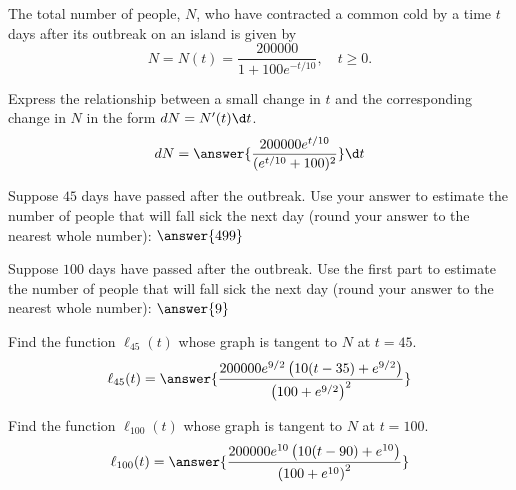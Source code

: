 \documentclass{ximera}
\begin{document}
The total number of people, $N$, who have contracted a common cold by a time $t$ days after its outbreak on an island is given by
\[
N=N(t)=\frac{200000}{1+100e^{-t/10}},\quad t\ge0.
\]
\begin{exercise}
Express the relationship between a small change in $t$ and the corresponding change in $N$ in the form $dN=N'(t)\d t$.
\[
dN=\answer{\frac{200000 e^{t/10}}{(e^{t/10}+100)^2}}\d t
\]
\begin{exercise}
Suppose $45$ days have passed after the outbreak. Use your answer to estimate the number of people that will fall sick the next day (round your answer to the nearest whole number): $\answer{499}$
\begin{exercise}
Suppose $100$ days have passed after the outbreak. Use the first part to estimate the number of people that will fall sick the next day (round your answer to the nearest whole number): $\answer{9}$
\begin{exercise}
Find the function $\ell_{45}(t)$ whose graph is tangent to $N$ at $t=45$.
\[
\ell_{45}(t)=\answer{\frac{200000 e^{9/2} \left(10 (t-35)+e^{9/2}\right)}{\left(100+e^{9/2}\right)^2}}
\]
\begin{exercise}
Find the function $\ell_{100}(t)$ whose graph is tangent to $N$ at $t=100$.
\[
\ell_{100}(t)=\answer{\frac{200000 e^{10} \left(10 (t-90)+e^{10}\right)}{\left(100+e^{10}\right)^2}}
\]
\end{exercise}
\end{exercise}
\end{exercise}
\end{exercise}
\end{exercise}
\end{document}
